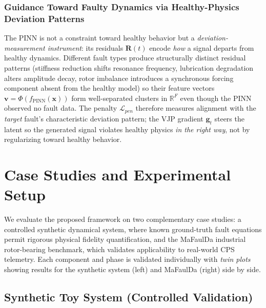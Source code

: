 \documentclass[conference]{IEEEtran}
\newcommand{\PINN}{f_{\text{PINN}}}
\newcommand{\Feat}{\Phi}
\newcommand{\x}{\mathbf{x}}
\newcommand{\bv}{\mathbf{v}}          %
\newcommand{\g}{\mathbf{g}}
\newcommand{\R}{\mathbf{R}}
\begin{document}
\subsubsection{Guidance Toward Faulty Dynamics via Healthy-Physics Deviation Patterns}
The PINN is not a constraint toward healthy behavior but a \emph{deviation-measurement instrument}: its residuals $\R(t)$ encode \emph{how} a signal departs from healthy dynamics. Different fault types produce structurally distinct residual patterns (stiffness reduction shifts resonance frequency, lubrication degradation alters amplitude decay, rotor imbalance introduces a synchronous forcing component absent from the healthy model) so their feature vectors $\bv\!=\!\Feat(\PINN(\x))$ form well-separated clusters in $\mathbb{R}^F$ even though the PINN observed no fault data. The penalty $\mathcal{L}_{pen}$ therefore measures alignment with the \emph{target} fault's characteristic deviation pattern; the VJP gradient $\g_t$ steers the latent so the generated signal violates healthy physics \emph{in the right way}, not by regularizing toward healthy behavior.


\section{Case Studies and Experimental Setup}
\label{sec:experiments}

We evaluate the proposed framework on two complementary case studies: a controlled synthetic dynamical system, where known ground-truth fault equations permit rigorous physical fidelity quantification, and the MaFaulDa industrial rotor-bearing benchmark, which validates applicability to real-world CPS telemetry. Each component and phase is validated individually with \emph{twin plots} showing results for the synthetic system (left) and MaFaulDa (right) side by side.

\subsection{Synthetic Toy System (Controlled Validation)}
\end{document}
